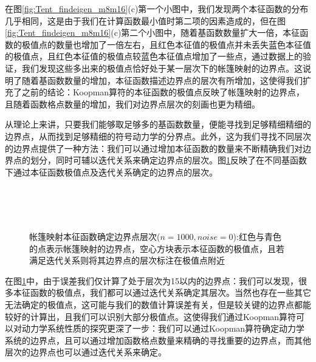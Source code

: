 在图\ref{fig:Tent_findeigen_m8m16}(c)第一个小图中，我们发现两个本征函数的分布几乎相同，这是由于我们在计算函数最小值时第二项的因素造成的，但在图\ref{fig:Tent_findeigen_m8m16}(c)第二个小图中，随着基函数数量扩大一倍，本征函数的极值点的数量也增加了一倍左右，且红色本征值的极值点并未丢失蓝色本征值的极值点，且红色本征值的极值点较蓝色本征值点增加了一些点，通过数据上的验证，我们发现这些多出来的极值点恰好处于某一层次下的帐篷映射的边界点。这说明了随着基函数数量的增加，本征函数描述边界点的层次有所增加，这使得我们扩充了之前的结论：Koopman算符的本征函数的极值点反映了帐篷映射的边界点，且随着函数格点数量的增加，我们对边界点层次的刻画也更为精细。

从理论上来讲，只要我们能够取足够多的基函数数量，便能寻找到足够精细精细的边界点，从而找到足够精细的符号动力学的分界点。此外，这为我们寻找不同层次的边界点提供了一种方法：我们可以通过增加本征函数的数量来不断精确我们对边界点的划分，同时可辅以迭代关系来确定边界点的层次。图\ref{fig:Tent_auto_level_n1000_m4}反映了在不同基函数下通过本征函数极值点及迭代关系确定的边界点的层次。

\begin{figure}[!]
  \centering
    \\
    \\
    \\
  \caption[帐篷映射本征函数确定边界点层次]{帐篷映射本征函数确定边界点层次($n=1000,noise=0$):红色与青色的点表示帐篷映射的边界点，空心方块表示本征函数的极值点，且若满足迭代关系则将其边界点的层次标注在极值点附近}\label{fig:Tent_auto_level_n1000_m4}
\end{figure}

在图\ref{fig:Tent_auto_level_n1000_m4}中，由于误差我们仅计算了处于层次为15以内的边界点：我们可以发现，很多本征函数的极值点，我们都可以通过迭代关系确定其层次。当然也存在一些其它无法确定的极值点，这可能与我们的数值计算误差有关，但是较关键的边界点都能较好的计算出，且我们可以识别大部分极值点。这使得我们通过Koopman算符可以对动力学系统性质的探究更深了一步：我们可以通过Koopman算符确定动力学系统的边界点，且可以通过增加函数格点数量来精确的寻找重要的边界点，而其他层次的边界点也可以通过迭代关系来确定。


